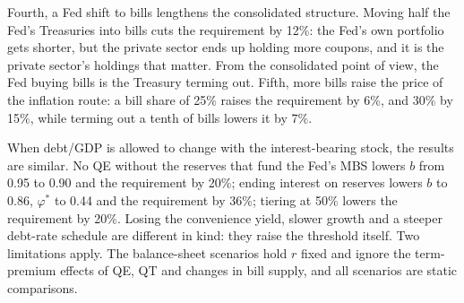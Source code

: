 Fourth, a Fed shift to bills lengthens the consolidated structure. Moving half the Fed's Treasuries into bills cuts the requirement by 12\%: the Fed's own portfolio gets shorter, but the private sector ends up holding more coupons, and it is the private sector's holdings that matter. From the consolidated point of view, the Fed buying bills is the Treasury terming out. Fifth, more bills raise the price of the inflation route: a bill share of 25\% raises the requirement by 6\%, and 30\% by 15\%, while terming out a tenth of bills lowers it by 7\%.

When debt/GDP is allowed to change with the interest-bearing stock, the results are similar. No QE without the reserves that fund the Fed's MBS lowers $b$ from 0.95 to 0.90 and the requirement by 20\%; ending interest on reserves lowers $b$ to 0.86, $\varphi^*$ to 0.44 and the requirement by 36\%; tiering at 50\% lowers the requirement by 20\%. Losing the convenience yield, slower growth and a steeper debt-rate schedule are different in kind: they raise the threshold itself. Two limitations apply. The balance-sheet scenarios hold $r$ fixed and ignore the term-premium effects of QE, QT and changes in bill supply, and all scenarios are static comparisons.
